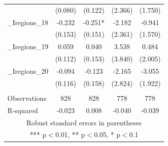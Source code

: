 \documentclass[]{article}
\begin{document}
\begin{tabular}{lcccc}
 & (0.080) & (0.122) & (2.366) & (1.750) \\
\_Iregions\_18 & -0.232 & -0.251* & -2.182 & -0.941 \\
 & (0.153) & (0.151) & (2.361) & (1.570) \\
\_Iregions\_19 & 0.059 & 0.040 & 3.538 & 0.484 \\
 & (0.112) & (0.153) & (3.840) & (2.005) \\
\_Iregions\_20 & -0.094 & -0.123 & -2.165 & -3.055 \\
 & (0.116) & (0.158) & (2.824) & (1.922) \\
 &  &  &  &  \\
Observations & 828 & 828 & 778 & 778 \\
 R-squared & -0.023 & 0.008 & -0.040 & -0.039 \\ \hline
\multicolumn{5}{c}{ Robust standard errors in parentheses} \\
\multicolumn{5}{c}{ *** p$<$0.01, ** p$<$0.05, * p$<$0.1} \\
\end{tabular}
\end{document}
